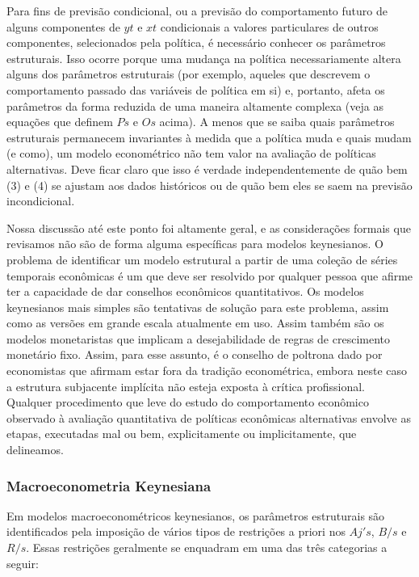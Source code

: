 \documentclass[12pt]{article}
\begin{document}
Para fins de previsão condicional, ou a previsão do comportamento futuro de alguns componentes de $yt$ e $xt$ condicionais a valores particulares de outros componentes, selecionados pela política, é necessário conhecer os parâmetros estruturais. Isso ocorre porque uma mudança na política necessariamente altera alguns dos parâmetros estruturais (por exemplo, aqueles que descrevem o comportamento passado das variáveis de política em si) e, portanto, afeta os parâmetros da forma reduzida de uma maneira altamente complexa (veja as equações que definem $Ps$ e $Os$ acima). A menos que se saiba quais parâmetros estruturais permanecem invariantes à medida que a política muda e quais mudam (e como), um modelo econométrico não tem valor na avaliação de políticas alternativas. Deve ficar claro que isso é verdade independentemente de quão bem (3) e (4) se ajustam aos dados históricos ou de quão bem eles se saem na previsão incondicional.

Nossa discussão até este ponto foi altamente geral, e as considerações formais que revisamos não são de forma alguma específicas para modelos keynesianos. O problema de identificar um modelo estrutural a partir de uma coleção de séries temporais econômicas é um que deve ser resolvido por qualquer pessoa que afirme ter a capacidade de dar conselhos econômicos quantitativos. Os modelos keynesianos mais simples são tentativas de solução para este problema, assim como as versões em grande escala atualmente em uso. Assim também são os modelos monetaristas que implicam a desejabilidade de regras de crescimento monetário fixo. Assim, para esse assunto, é o conselho de poltrona dado por economistas que afirmam estar fora da tradição econométrica, embora neste caso a estrutura subjacente implícita não esteja exposta à crítica profissional. Qualquer procedimento que leve do estudo do comportamento econômico observado à avaliação quantitativa de políticas econômicas alternativas envolve as etapas, executadas mal ou bem, explicitamente ou implicitamente, que delineamos.

\subsubsection{\textbf{Macroeconometria Keynesiana}}


Em modelos macroeconométricos keynesianos, os parâmetros estruturais são identificados pela imposição de vários tipos de restrições a priori nos $Aj's$, $B/s$ e $R/s$. Essas restrições geralmente se enquadram em uma das três categorias a seguir:
\end{document}
